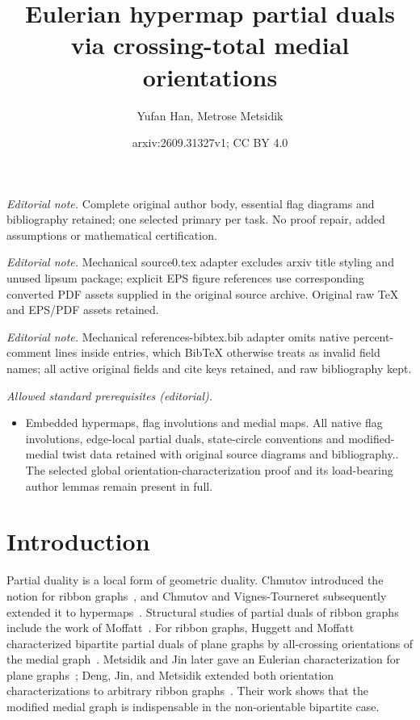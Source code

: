 \documentclass[10pt,a4paper]{article}
\title{Eulerian hypermap partial duals via crossing-total medial orientations}
\author{Yufan Han, Metrose Metsidik}
\date{arxiv:2609.31327v1; CC BY 4.0}
\theoremstyle{definition}
\theoremstyle{remark}
\begin{document}
\maketitle
\noindent\textit{Editorial note.} Complete original author body, essential flag diagrams and bibliography retained; one selected primary per task. No proof repair, added assumptions or mathematical certification.\par\medskip
\noindent\textit{Editorial note.} Mechanical source0.tex adapter excludes arxiv title styling and unused lipsum package; explicit EPS figure references use corresponding converted PDF assets supplied in the original source archive. Original raw TeX and EPS/PDF assets retained.\par\medskip
\noindent\textit{Editorial note.} Mechanical references-bibtex.bib adapter omits native percent-comment lines inside entries, which BibTeX otherwise treats as invalid field names; all active original fields and cite keys retained, and raw bibliography kept.\par\medskip
\noindent\textit{Allowed standard prerequisites (editorial).}\begin{itemize}
\item Embedded hypermaps, flag involutions and medial maps. All native flag involutions, edge-local partial duals, state-circle conventions and modified-medial twist data retained with original source diagrams and bibliography.. The selected global orientation-characterization proof and its load-bearing author lemmas remain present in full.
\end{itemize}\medskip
\section{Introduction}

Partial duality is a local form of geometric duality. Chmutov introduced the notion for ribbon graphs~\cite{Chmutov2009}, and Chmutov and Vignes-Tourneret subsequently extended it to hypermaps~\cite{ChmutovVignes2022}. Structural studies of partial duals of ribbon graphs include the work of Moffatt~\cite{Moffatt2011,Moffatt2013}. For ribbon graphs, Huggett and Moffatt characterized bipartite partial duals of plane graphs by all-crossing orientations of the medial graph~\cite{HuggettMoffatt2013}. Metsidik and Jin later gave an Eulerian characterization for plane graphs~\cite{MetsidikJin2018}; Deng, Jin, and Metsidik extended both orientation characterizations to arbitrary ribbon graphs~\cite{DengJinMetsidik2020}. Their work shows that the modified medial graph is indispensable in the non-orientable bipartite case.
\end{document}
